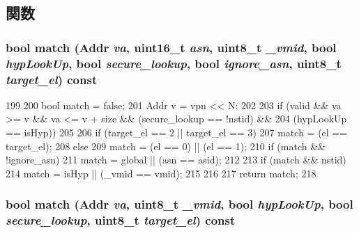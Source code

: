 \subsection{関数}
\hypertarget{structArmISA_1_1TlbEntry_afdf6523eda5c6858082970698c7b20b0}{
\subsubsection[{match}]{\setlength{\rightskip}{0pt plus 5cm}bool match ({\bf Addr} {\em va}, \/  uint16\_\-t {\em asn}, \/  uint8\_\-t {\em \_\-vmid}, \/  bool {\em hypLookUp}, \/  bool {\em secure\_\-lookup}, \/  bool {\em ignore\_\-asn}, \/  uint8\_\-t {\em target\_\-el}) const}}
\label{structArmISA_1_1TlbEntry_afdf6523eda5c6858082970698c7b20b0}



\begin{DoxyCode}
199     {
200         bool match = false;
201         Addr v = vpn << N;
202 
203         if (valid && va >= v && va <= v + size && (secure_lookup == !nstid) &&
204             (hypLookUp == isHyp))
205         {
206             if (target_el == 2 || target_el == 3)
207                 match = (el == target_el);
208             else
209                 match = (el == 0) || (el == 1);
210             if (match && !ignore_asn) {
211                 match = global || (asn == asid);
212             }
213             if (match && nstid) {
214                 match = isHyp || (_vmid == vmid);
215             }
216         }
217         return match;
218     }
\end{DoxyCode}
\hypertarget{structArmISA_1_1TlbEntry_a5c66b3ae8abc8a1af010fd8331612e4b}{
\subsubsection[{match}]{\setlength{\rightskip}{0pt plus 5cm}bool match ({\bf Addr} {\em va}, \/  uint8\_\-t {\em \_\-vmid}, \/  bool {\em hypLookUp}, \/  bool {\em secure\_\-lookup}, \/  uint8\_\-t {\em target\_\-el}) const}}
\label{structArmISA_1_1TlbEntry_a5c66b3ae8abc8a1af010fd8331612e4b}



